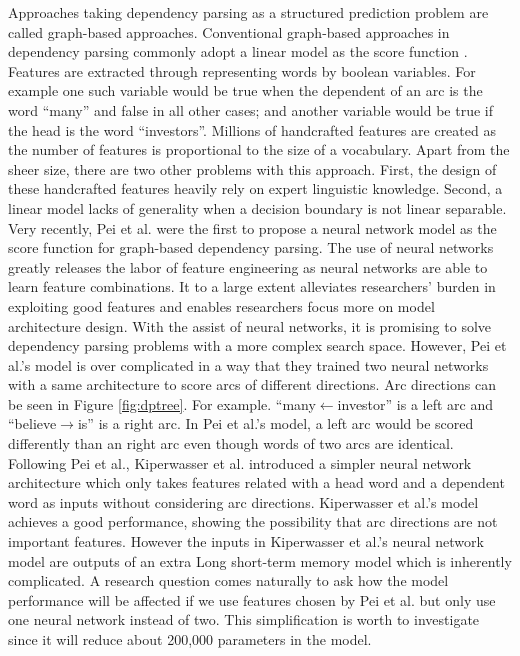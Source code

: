 Approaches taking dependency parsing as a structured prediction problem are called graph-based approaches. Conventional graph-based approaches in dependency parsing commonly adopt a linear model as the score function \cite{mcdonald2005online} \cite{mcdonald2005non} \cite{mcdonald2006online} \cite{koo2010efficient}. Features are extracted through representing words by boolean variables. For example one such variable would be true when the dependent of an arc is the word ``many'' and false in all other cases; and another variable would be true if the head is the word ``investors''.  Millions of handcrafted features are created as the number of features is proportional to the size of a vocabulary. Apart from the sheer size, there are two other problems with this approach. First, the design of these handcrafted features heavily rely on expert linguistic knowledge. Second, a linear model lacks of generality when a decision boundary is not linear separable. Very recently, Pei et al. \cite{pei2015} were the first to propose a neural network model as the score function for graph-based dependency parsing. The use of neural networks greatly releases the labor of feature engineering as neural networks are able to learn feature combinations. It to a large extent alleviates researchers' burden in exploiting good features and enables researchers focus more on model architecture design. With the assist of neural networks, it is promising to solve dependency parsing problems with a more complex search space.
 However, Pei et al.'s model is over complicated in a way that they trained two neural networks with a same architecture to score arcs of different directions. Arc directions can be seen in Figure \ref{fig:dptree}. For example. ``many$\leftarrow$investor'' is a left arc and ``believe$\rightarrow$is'' is a right arc. In Pei et al.'s model, a left arc would be scored differently than an right arc even though words of two arcs are identical. Following Pei et al., Kiperwasser et al. \cite{kiperwasser2016simple} introduced a simpler neural network architecture which only takes features related with a head word and a dependent word as inputs without considering arc directions. Kiperwasser et al.'s model achieves a good performance, showing the possibility that arc directions are not important features. However the inputs in Kiperwasser et al.'s neural network model are outputs of an extra Long short-term memory model which is inherently complicated. A research question comes naturally to ask how the model performance will be affected if we use features chosen by Pei et al. but only use one neural network instead of two. This simplification is worth to investigate since it will reduce about 200,000 parameters in the model.

